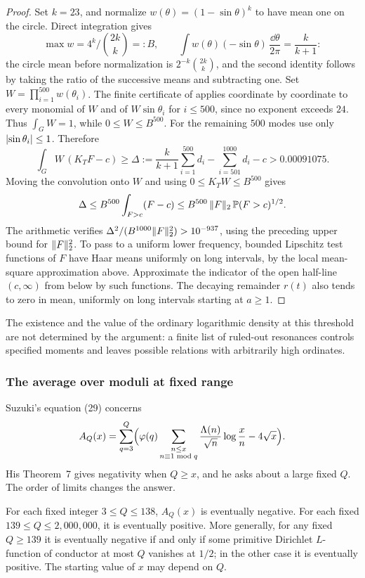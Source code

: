 \begin{proof}
Set $k=23$, and normalize $w(\theta)=(1-\sin\theta)^k$ to have mean one on the circle.
Direct integration gives
\[
 \max w=4^k\Big/\binom{2k}k=:B,\qquad
 \int w(\theta)(-\sin\theta)\,\frac{\dd\theta}{2\pi}=\frac k{k+1}:
\]
the circle mean before normalization is $2^{-k}\binom{2k}k$, and the second identity
follows by taking the ratio of the successive means and subtracting one. Set
$W=\prod_{i=1}^{500}w(\theta_i)$. The finite certificate of \cite{BestTrudgian2015Linear}
applies coordinate by coordinate to every monomial of $W$ and of $W\sin\theta_i$ for
$i\le500$, since no exponent exceeds $24$. Thus $\int_GW=1$, while $0\le W\le B^{500}$. For
the remaining $500$ modes use only $\lvert\sin\theta_i\rvert\le1$. Therefore
\[
 \int_GW\,(K_TF-c)\ge\Delta:=\frac k{k+1}\sum_{i=1}^{500}d_i-\sum_{i=501}^{1000}d_i-c
 >0.00091075 .
\]
Moving the convolution onto $W$ and using $0\le K_TW\le B^{500}$ gives
\[
 \Delta\le B^{500}\int_{F>c}(F-c)\le B^{500}\,\lVert F\rVert_2\,\mathbb P(F>c)^{1/2}.
\]
The arithmetic verifies $\Delta^2/(B^{1000}\lVert F\rVert_2^2)>10^{-937}$, using the preceding
upper bound for $\lVert F\rVert_2^2$. To pass to a uniform lower frequency, bounded Lipschitz test
functions of $F$ have Haar means uniformly on long intervals, by the local mean-square
approximation above. Approximate the indicator of the open half-line $(c,\infty)$ from
below by such functions. The decaying remainder $r(t)$ also tends to zero in mean,
uniformly on long intervals starting at $a\ge1$.
\end{proof}

The existence and the value of the ordinary logarithmic density at this threshold are not
determined by the argument: a finite list of ruled-out resonances controls specified
moments and leaves possible relations with arbitrarily high ordinates.

\subsubsection{The average over moduli at fixed range}
Suzuki's equation (29) \cite{Suzuki2025Variants} concerns
\[
 A_Q(x)=\sum_{q=3}^Q\Bigl(\varphi(q)\sum_{\substack{n\le x\\n\equiv1\bmod q}}
   \frac{\Lambda(n)}{\sqrt n}\log\frac xn-4\sqrt x\Bigr).
\]
His Theorem~7 gives negativity when $Q\ge x$, and he asks about a large fixed $Q$. The
order of limits changes the answer.

\begin{theorem}[\stG]\label{zer:thm:suzukiQ}
For each fixed integer $3\le Q\le138$, $A_Q(x)$ is eventually negative. For each fixed
$139\le Q\le2{,}000{,}000$, it is eventually positive. More generally, for any fixed
$Q\ge139$ it is eventually negative if and only if some primitive Dirichlet $L$-function of
conductor at most $Q$ vanishes at $1/2$; in the other case it is eventually positive. The
starting value of $x$ may depend on $Q$.
\end{theorem}

